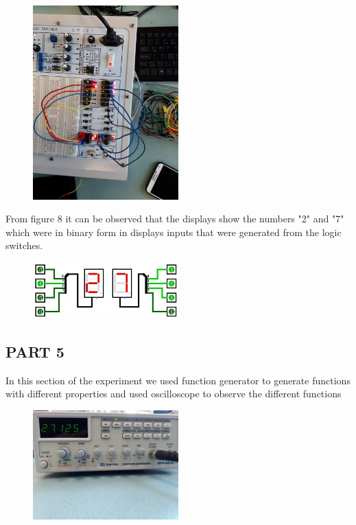 \documentclass[pdftex,12pt,a4paper]{article}
\begin{document}
\begin{figure}[h]
	\centering
	\includegraphics[width=0.5\textwidth]{8.jpg}
	\caption
	\label{Figure 8}
\end{figure}
From figure 8 it can be observed that the displays show the numbers "2" and "7" which were in binary form in displays inputs that were generated from the logic switches.

\begin{figure}[h]
	\centering
	\includegraphics[width=0.5\textwidth]{8.1.jpg}
	\caption
	\label{Figure 8.1}
\end{figure}


\clearpage
\subsection{PART 5}
In this section of the experiment we used function generator to generate functions with different properties and used oscilloscope to observe the different functions 

\begin{figure}[h]
	\centering
	\includegraphics[width=0.5\textwidth]{9.jpg}
	\caption
	\label{Figure 9}
\end{figure}
\end{document}

